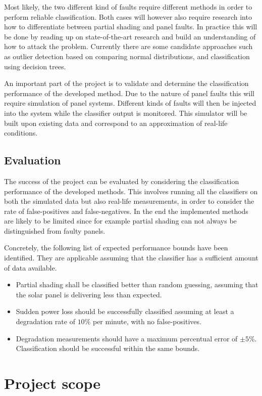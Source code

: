 \documentclass[a4paper,11pt]{article}
\begin{document}
Most likely, the two different kind of faults require different methods in order to perform reliable classification.
Both cases will however also require research into how to differentiate between partial shading and panel faults.
In practice this will be done by reading up on state-of-the-art research and build an understanding of how to attack the problem.
Currently there are some candidate approaches such as outlier detection based on comparing normal distributions, and classification using decision trees.

An important part of the project is to validate and determine the classification performance of the developed method.
Due to the nature of panel faults this will require simulation of panel systems.
Different kinds of faults will then be injected into the system while the classifier output is monitored.
This simulator will be built upon existing data and correspond to an approximation of real-life conditions.

\subsection*{Evaluation}
The success of the project can be evaluated by considering the classification performance of the developed methods.
This involves running all the classifiers on both the simulated data but also real-life measurements, in order to consider the rate of false-positives and false-negatives.
In the end the implemented methods are likely to be limited since for example partial shading can not always be distinguished from faulty panels.

Concretely, the following list of expected performance bounds have been identified.
They are applicable assuming that the classifier has a sufficient amount of data available.
\begin{itemize}
\item Partial shading shall be classified better than random guessing, assuming that the solar panel is delivering less than expected.
\item Sudden power loss should be successfully classified assuming at least a degradation rate of $10\%$ per minute, with no false-positives.
\item Degradation measurements should have a maximum percentual error of $\pm 5\%$. Classification should be successful within the same bounds.
\end{itemize}

\section*{Project scope}
\end{document}

